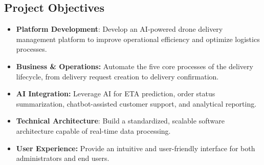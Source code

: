 \subsection{Project Objectives}

\begin{itemize}
  \item \textbf{Platform Development}: Develop an AI-powered drone delivery management platform to improve operational efficiency and optimize logistics processes.
  \item \textbf{Business \& Operations:} Automate the five core processes of the delivery lifecycle, from delivery request creation to delivery confirmation.
  \item \textbf{AI Integration:} Leverage AI for ETA prediction, order status summarization, chatbot-assisted customer support, and analytical reporting.
  \item \textbf{Technical Architecture}: Build a standardized, scalable software architecture capable of real-time data processing.
  \item \textbf{User Experience:} Provide an intuitive and user-friendly interface for both administrators and end users.
\end{itemize}
